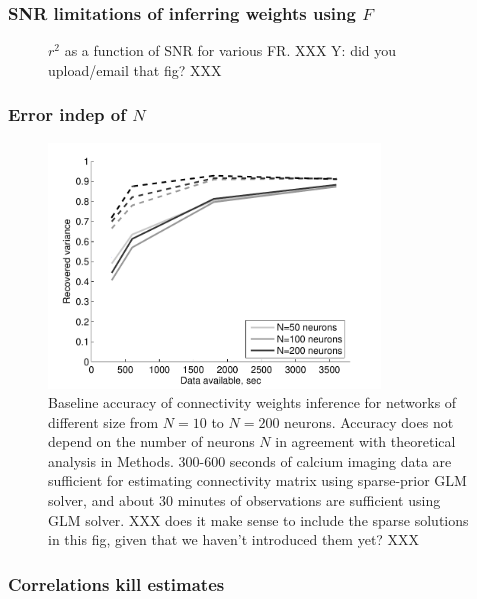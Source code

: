 \clearpage
\subsubsection{SNR limitations of inferring weights using $F$}

\begin{figure}[h]
\caption{$r^2$ as a function of SNR for various FR. XXX Y: did you upload/email that fig? XXX}
\label{fig:snr}
\end{figure}

\clearpage
\subsubsection{Error indep of $N$}

\begin{figure}[h]
\centering
\includegraphics[width=250pt]{../figs/Figure6c_perf_vs_N}
\caption{Baseline accuracy of connectivity weights inference for networks of different size from $N=10$ to $N=200$ neurons. Accuracy does not depend on the number of neurons $N$ in agreement with theoretical analysis in Methods. 300-600 seconds of calcium imaging data are sufficient for estimating connectivity matrix using sparse-prior GLM solver, and about 30 minutes of observations are sufficient using GLM solver. XXX  does it make sense to include the sparse solutions in this fig, given that we haven't introduced them yet? XXX}
\label{fig:data-n}
\end{figure}


\clearpage
\subsubsection{Correlations kill estimates}

